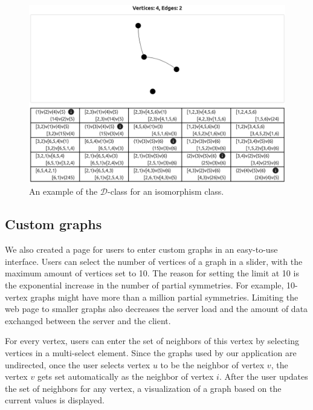\begin{figure}[H]
\begin{center}
\includegraphics[width=\textwidth,keepaspectratio]{images/website_d_class.png}
\end{center}
\caption{An example of the $\mathcal{D}$-class for an isomorphism class.}
\label{fig:website_d_class}
\end{figure}

\subsection{Custom graphs}

We also created a page for users to enter custom graphs in an easy-to-use interface. Users can select the number of vertices of a graph in a slider, with the maximum amount of vertices set to 10. The reason for setting the limit at 10 is the exponential increase in the number of partial symmetries. For example, 10-vertex graphs might have more than a million partial symmetries. Limiting the web page to smaller graphs also decreases the server load and the amount of data exchanged between the server and the client.

For every vertex, users can enter the set of neighbors of this vertex by selecting vertices in a multi-select element. Since the graphs used by our application are undirected, once the user selects vertex $u$ to be the neighbor of vertex $v$, the vertex $v$ gets set automatically as the neighbor of vertex $i$. After the user updates the set of neighbors for any vertex, a visualization of a graph based on the current values is displayed.

